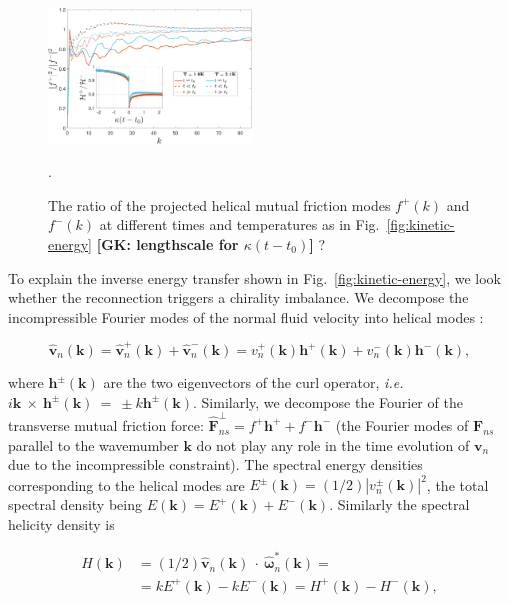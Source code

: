 \documentclass[%
 reprint,
 amsmath,amssymb,
 aps,
 prl,
]{revtex4-2}
\def \k{\mathbf{k}}
\def \h{\mathbf{h}}
\newcommand*{\NOTE}[1]{\textbf{\color{red}[#1]}}
\begin{document}
\begin{figure}[b]
    \centering
    \includegraphics*[width=0.48\textwidth]{fmfDecompFig.pdf}
    \caption{The ratio of the projected helical mutual friction modes $f^+(k)$ and $f^-(k)$
at different times and temperatures as in Fig.~\ref{fig:kinetic-energy} \NOTE{GK: lengthscale for $\kappa (t-t_0)$} ?}.
    \label{fig:mutual-friction-decomp}
\end{figure}

To explain the inverse energy transfer shown in Fig.~\ref{fig:kinetic-energy},
we look whether the reconnection triggers a chirality imbalance. 
We decompose the incompressible Fourier modes of the normal fluid velocity 
into helical modes \cite{waleffe-1992}:

\begin{equation}
\hat{\mathbf{v}}_n (\k) = \hat{\mathbf{v}}_n^+(\k) +\hat{\mathbf{v}}_n^-(\k)=
 v_n^+(\mathbf{k}) \mathbf{h}^+(\mathbf{k})+v_n^-(\mathbf{k}) \mathbf{h}^-(\mathbf{k}),
\end{equation}

\noindent 
where $\mathbf{h}^\pm (\mathbf{k})$ are the two eigenvectors of the curl 
operator, \textit{i.e.} $i\k~\times~\h^{\pm}(\k)~=~\pm k \h^{\pm}(\k)$. 
Similarly, we decompose the Fourier of the transverse mutual friction force:
$\hat{\mathbf{F}}_{ns}^{\perp} = f^+ \mathbf{h}^+ + f^- \mathbf{h}^-$
(the  Fourier modes of $\mathbf{F}_{ns}$ parallel to the wavemumber 
$\k$ do not play any role in the time evolution of $\mathbf{v}_n$ 
due to the incompressible constraint). 
The spectral energy densities corresponding to the helical modes are
$E^{\pm}(\k) = (1/2) |v_n^\pm(\k)|^2$, the total spectral density 
being $E(\k) = E^{+}(\k) + E^{-}(\k)$. Similarly the spectral helicity 
density is 

\begin{equation}
\begin{split}
H(\k) & = (1/2) \hat{\mathbf{v}}_n (\k)\!\!\! ~\cdot~\!\!\! \hat{\bm{\omega}}_n^* (\k) = \\
& = k E^+(\k) - k E^-(\k)  = H^+(\k) - H^-(\k),
\end{split}
\end{equation}
\end{document}
